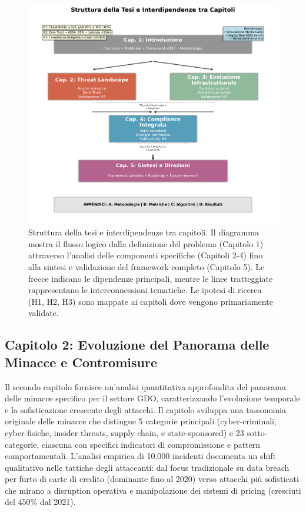 \begin{figure}[htbp]
\centering
\includegraphics[width=1\textwidth]{thesis_figures/cap1/fig_1_4_thesis_structure.pdf}
\caption{Struttura della tesi e interdipendenze tra capitoli. Il diagramma mostra il flusso logico dalla definizione del problema (Capitolo 1) attraverso l'analisi delle componenti specifiche (Capitoli 2-4) fino alla sintesi e validazione del framework completo (Capitolo 5). Le frecce indicano le dipendenze principali, mentre le linee tratteggiate rappresentano le interconnessioni tematiche. Le ipotesi di ricerca (H1, H2, H3) sono mappate ai capitoli dove vengono primariamente validate.}
\label{fig:thesis_structure}
\end{figure}

\subsection{Capitolo 2: Evoluzione del Panorama delle Minacce e Contromisure}

Il secondo capitolo fornisce un'analisi quantitativa approfondita del panorama delle minacce specifico per il settore GDO, caratterizzando l'evoluzione temporale e la sofisticazione crescente degli attacchi. Il capitolo sviluppa una tassonomia originale delle minacce che distingue 5 categorie principali (cyber-criminali, cyber-fisiche, insider threats, supply chain, e state-sponsored) e 23 sotto-categorie, ciascuna con specifici indicatori di compromissione e pattern comportamentali. L'analisi empirica di 10.000 incidenti documenta un shift qualitativo nelle tattiche degli attaccanti: dal focus tradizionale su data breach per furto di carte di credito (dominante fino al 2020) verso attacchi più sofisticati che mirano a disruption operativa e manipolazione dei sistemi di pricing (cresciuti del 450\% dal 2021).

